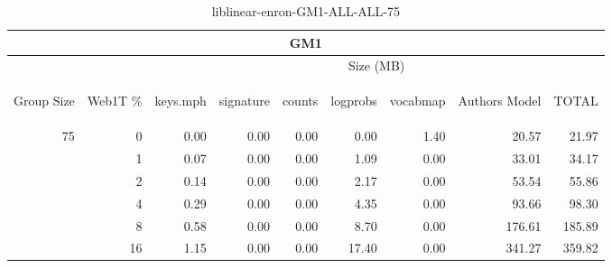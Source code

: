 \begin{center}
\begin{table}[htbp]
\begin{tabular}{ | r | r | r | r | r | r | r | r | r |}
\hline
\multicolumn{9}{|c|}{GM1}\\
\hline
 & & \multicolumn{7}{|c|}{Size (MB)}\\ \cline{3-9}
\begin{sideways}Group Size\end{sideways} & \begin{sideways}Web1T \% \end{sideways} & \begin{sideways}keys.mph\end{sideways} & \begin{sideways}signature\end{sideways} & \begin{sideways}counts\end{sideways} & \begin{sideways}logprobs\end{sideways} & \begin{sideways}vocabmap\end{sideways} & \begin{sideways}Authors Model \end{sideways} & \begin{sideways}TOTAL\end{sideways}\\
\hline
\multirow{5}{*}{75}
 & 0 & 0.00 & 0.00 & 0.00 & 0.00 & 1.40 & 20.57 & 21.97\\ \cline{2-9}
 & 1 & 0.07 & 0.00 & 0.00 & 1.09 & 0.00 & 33.01 & 34.17\\ \cline{2-9}
 & 2 & 0.14 & 0.00 & 0.00 & 2.17 & 0.00 & 53.54 & 55.86\\ \cline{2-9}
 & 4 & 0.29 & 0.00 & 0.00 & 4.35 & 0.00 & 93.66 & 98.30\\ \cline{2-9}
 & 8 & 0.58 & 0.00 & 0.00 & 8.70 & 0.00 & 176.61 & 185.89\\ \cline{2-9}
 & 16 & 1.15 & 0.00 & 0.00 & 17.40 & 0.00 & 341.27 & 359.82\\ \cline{2-9}
\hline
\end{tabular}
\caption{liblinear-enron-GM1-ALL-ALL-75}
\label{table:liblinear-enron-GM1-ALL-ALL-75}
\end{table}
\end{center}


